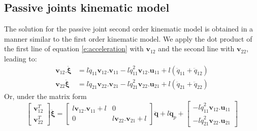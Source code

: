 \documentclass[a4paper]{article}
\begin{document}
\subsection{Passive joints kinematic model}
%
The solution for the passive joint second order kinematic model is obtained in a manner similar to the first order kinematic model. We apply the dot product of the first line of equation \eqref{e:acceleration} with $\mathbf{v}_{12}$ and the second line with $\mathbf{v}_{22}$, leading to:
\begin{equation}
    \begin{aligned}
    \mathbf{v}_{12}.\ddot{\boldsymbol{\xi}} &= l\ddot{q}_{11}\mathbf{v}_{12}.\mathbf{v}_{11} -l\dot{q}_{11}^{2}\mathbf{v}_{12}.\mathbf{u}_{11} + l(\ddot{q}_{11}+\ddot{q}_{12})\\
    \mathbf{v}_{22}\ddot{\boldsymbol{\xi}} &= l\ddot{q}_{21}\mathbf{v}_{22}.\mathbf{v}_{21} - l\dot{q}_{21}^{2}\mathbf{v}_{22}.\mathbf{u}_{21} + l(\ddot{q}_{21}+\ddot{q}_{22})
    \end{aligned}
\end{equation}
%
Or, under the matrix form
%
\begin{equation}
    \begin{bmatrix}
        \mathbf{v}_{12}^T\\ \mathbf{v}_{22}^T
    \end{bmatrix}\ddot{\boldsymbol{\xi}}
    =
    \begin{bmatrix}
        l\mathbf{v}_{12}.\mathbf{v}_{11} + l & 0\\
        0 & l\mathbf{v}_{22}.\mathbf{v}_{21} + l
    \end{bmatrix}
    \ddot{\mathbf{q}} + l \ddot{\mathbf{q}}_p + \begin{bmatrix}
        -l\dot{q}_{11}^{2}\mathbf{v}_{12}.\mathbf{u}_{11}\\
         - l\dot{q}_{21}^{2}\mathbf{v}_{22}.\mathbf{u}_{21}
    \end{bmatrix}
\end{equation}
%
\end{document}
